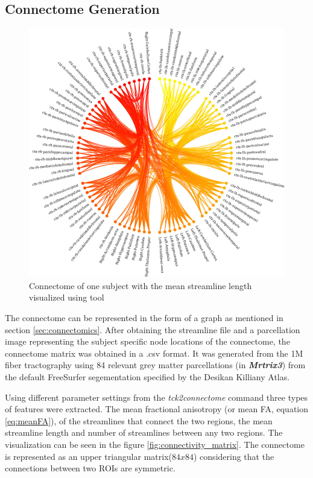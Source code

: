 \documentclass[msthesis.tex]{subfiles}
\begin{document}
\subsection{Connectome Generation}
\label{subsec:connectome_generation}
\begin{figure}
    \centering
    \includegraphics[width=\textwidth]{images/brain-data-viewer_2.png}
    \caption{Connectome of one subject with the mean streamline length visualized using tool }
    \label{fig:my_label}
\end{figure}
The connectome can be represented in the form of a graph as mentioned in section \ref{sec:connectomics}. After obtaining the streamline file and a parcellation image representing the subject specific node locations of the connectome, the connectome matrix was obtained in a .csv format. It was generated from the 1M fiber tractography using 84 relevant grey matter parcellations (in \textit{\textbf{Mrtrix3}}) from the default FreeSurfer segementation specified by the Desikan Killiany Atlas. 

Using different parameter settings from the \textit{tck2connectome} command three types of features  were extracted. The mean fractional anisotropy (or mean FA, equation \ref{eq:meanFA}), of the streamlines that connect the two regions, the mean streamline length and number of streamlines between any two regions. The visualization can be seen in the figure \ref{fig:connectivity_matrix}. The connectome is represented as an upper triangular matrix($84 x 84$) considering that the connections between two ROIs are symmetric.
\end{document}
